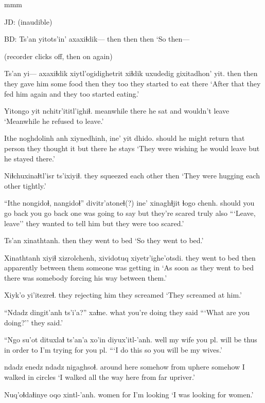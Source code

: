 \documentclass[12pt]{article}
\begin{document}
mmm

JD: (inaudible)

BD:
\gll Ts'an yitots'in' axaxiɬdik---
then then then
\glt `So then---
\glend

(recorder clicks off, then on again)

\gll Ts'an yi--- axaxiɬdik xiytl'ogidighetrit xiɬdik uxudedig gixitadhon' yit.
then {} then {they gave him some food} then {they too} {they started to eat} there
\glt `After that they fed him again and they too started eating.'
\glend

\gll Yitongo yit nchitr'ititl'ighiɬ.
meanwhile there {he sat and wouldn't leave}
\glt `Meanwhile he refused to leave.'
\glend

\gll Ithe noghdolinh anh xiynedhinh, ine' yit dhido.
should {he might return} {that person} {they thought it} but there {he stays}
\glt `They were wishing he would leave but he stayed there.'
\glend

\gll Niɬchuxinaɬtl'isr ts'ixiyiɬ.
{they squeezed each other} then
\glt `They were hugging each other tightly.'
\glend

\gll ``Ithe nongidoɬ, nangidoɬ'' divitr'atoneɬ(?) ine' xinaghɬjit ɬogo chenh.
should {you go back} {you go back} {one was going to say} but {they're scared} truly also
\glt ```Leave, leave'' they wanted to tell him but they were too scared.'
\glend

\gll Ts'an xinathtanh.
then {they went to bed}
\glt `So they went to bed.'
\glend

\gll Xinathtanh xiyiɬ xizrolchenh, xividotuq xiyetr'ighe'otsdi.
{they went to bed} then apparently {between them} {someone was getting in}
\glt `As soon as they went to bed there was somebody forcing his way between them.'
\glend

\gll Xiyk'o yi'itezreɬ.
{they rejecting him} {they screamed}
\glt `They screamed at him.'
\glend

\gll ``Ndadz dingit'anh ts'i'a?'' xaɬne.
what {you're doing} {} {they said}
\glt ```What are you doing?'' they said.'
\glend

\gll ``Ngo su'ot dituxlaɬ ts'an'a xo'in diyux'itl-'anh.
well {my wife} {you pl. will be} thus {in order to} {I'm trying for you pl.}
\glt ```I do this so you will be my wives.'
\glend

 ndadz enedz ndadz nigaghsoɬ.
{around here} somehow {from uphere} {somehow} {I walked in circles}
\glt `I walked all the way here from far upriver.'
\glend

\gll Nuq'oɬdaɬinye oqo xintl-'anh.
women for {I'm looking}
\glt `I was looking for women.'
\glend
\end{document}
